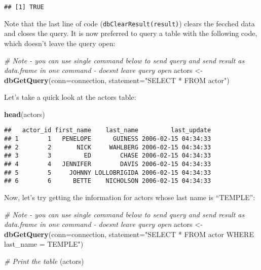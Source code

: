 \documentclass[
]{article}
\newenvironment{Shaded}{\begin{snugshade}}{\end{snugshade}}
\newcommand{\CommentTok}[1]{\textcolor[rgb]{0.56,0.35,0.01}{\textit{#1}}}
\newcommand{\DataTypeTok}[1]{\textcolor[rgb]{0.13,0.29,0.53}{#1}}
\newcommand{\KeywordTok}[1]{\textcolor[rgb]{0.13,0.29,0.53}{\textbf{#1}}}
\newcommand{\NormalTok}[1]{#1}
\newcommand{\StringTok}[1]{\textcolor[rgb]{0.31,0.60,0.02}{#1}}
\begin{document}
\begin{verbatim}
## [1] TRUE
\end{verbatim}

Note that the last line of code (\texttt{dbClearResult(result)}) clears
the fecched data and closes the query. It is now preferred to query a
table with the following code, which doesn't leave the query open:

\begin{Shaded}
\begin{Highlighting}[]
\CommentTok{\# Note {-} you can use single command below to send query and send result as data.frame in one command {-} doesn\textquotesingle{}t leave query open}
\NormalTok{actors \textless{}{-}}\StringTok{ }\KeywordTok{dbGetQuery}\NormalTok{(}\DataTypeTok{conn=}\NormalTok{connection, }\DataTypeTok{statement=}\StringTok{"SELECT * FROM actor"}\NormalTok{)}
\end{Highlighting}
\end{Shaded}

Let's take a quick look at the actors table:

\begin{Shaded}
\begin{Highlighting}[]
\KeywordTok{head}\NormalTok{(actors)}
\end{Highlighting}
\end{Shaded}

\begin{verbatim}
##   actor_id first_name    last_name         last_update
## 1        1   PENELOPE      GUINESS 2006-02-15 04:34:33
## 2        2       NICK     WAHLBERG 2006-02-15 04:34:33
## 3        3         ED        CHASE 2006-02-15 04:34:33
## 4        4   JENNIFER        DAVIS 2006-02-15 04:34:33
## 5        5     JOHNNY LOLLOBRIGIDA 2006-02-15 04:34:33
## 6        6      BETTE    NICHOLSON 2006-02-15 04:34:33
\end{verbatim}

Now, let's try getting the information for actors whose last name is
``TEMPLE'':

\begin{Shaded}
\begin{Highlighting}[]
\CommentTok{\# Note {-} you can use single command below to send query and send result as data.frame in one command {-} doesn\textquotesingle{}t leave query open}
\NormalTok{actors \textless{}{-}}\StringTok{ }\KeywordTok{dbGetQuery}\NormalTok{(}\DataTypeTok{conn=}\NormalTok{connection, }\DataTypeTok{statement=}\StringTok{"SELECT * FROM actor WHERE last\_name = \textquotesingle{}TEMPLE\textquotesingle{}"}\NormalTok{)}

\CommentTok{\# Print the table}
\NormalTok{(actors)}
\end{Highlighting}
\end{Shaded}
\end{document}
